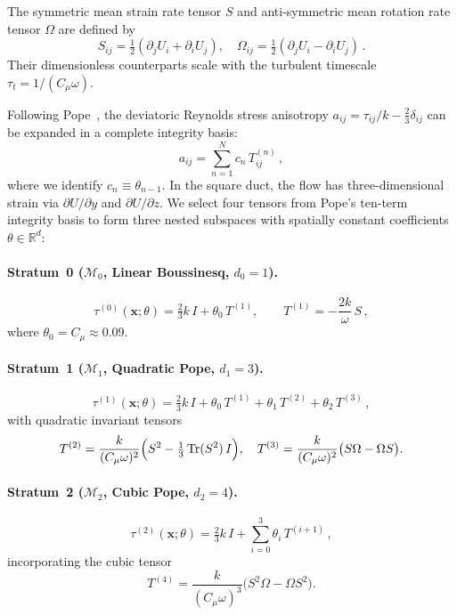 \documentclass[preprint,aps,prb,longbibliography,superscriptaddress]{revtex4-2}
\newcommand{\bx}{\mathbf{x}}
\newcommand{\Tr}{\operatorname{Tr}}
\begin{document}
The symmetric mean strain rate tensor $S$ and anti-symmetric mean rotation rate
tensor $\Omega$ are defined by
\begin{equation}
  S_{ij} = \tfrac{1}{2}(\partial_j U_i + \partial_i U_j), \quad
  \Omega_{ij} = \tfrac{1}{2}(\partial_j U_i - \partial_i U_j)\,.
\end{equation}
Their dimensionless counterparts scale with the turbulent timescale
$\tau_t = 1/(C_\mu \omega)$.

Following Pope~\cite{Pope1975}, the deviatoric Reynolds stress anisotropy
$a_{ij} = \tau_{ij}/k - \tfrac{2}{3}\delta_{ij}$ can be expanded in a
complete integrity basis:
\begin{equation}\label{eq:pope_expansion}
  a_{ij} = \sum_{n=1}^{N} c_n\, T_{ij}^{(n)}\,,
\end{equation}
where we identify $c_n \equiv \theta_{n-1}$. In the square duct, the flow has
three-dimensional strain via $\partial U/\partial y$ and $\partial U/\partial z$.
We select four tensors from Pope's ten-term integrity basis to form three
nested subspaces with spatially constant coefficients $\theta \in \mathbb{R}^d$:

\paragraph{Stratum~0 ($\mathcal{M}_0$, Linear Boussinesq, $d_0 = 1$).}
\begin{equation}\label{eq:stratum0}
  \tau^{(0)}(\bx;\theta) = \tfrac{2}{3}k\,I + \theta_0\, T^{(1)},
  \qquad
  T^{(1)} = -\frac{2k}{\omega}\, S\,,
\end{equation}
where $\theta_0 = C_\mu \approx 0.09$.

\paragraph{Stratum~1 ($\mathcal{M}_1$, Quadratic Pope, $d_1 = 3$).}
\begin{equation}\label{eq:stratum1}
  \tau^{(1)}(\bx;\theta) = \tfrac{2}{3}k\,I
  + \theta_0\, T^{(1)}
  + \theta_1\, T^{(2)}
  + \theta_2\, T^{(3)}\,,
\end{equation}
with quadratic invariant tensors
\begin{equation}\label{eq:T2T3}
  T^{(2)} = \frac{k}{(C_\mu\omega)^2}
    \Bigl(S^2 - \tfrac{1}{3}\Tr(S^2)\,I\Bigr),
  \quad
  T^{(3)} = \frac{k}{(C_\mu\omega)^2}
    \bigl(S\Omega - \Omega S\bigr).
\end{equation}

\paragraph{Stratum~2 ($\mathcal{M}_2$, Cubic Pope, $d_2 = 4$).}
\begin{equation}\label{eq:stratum2}
  \tau^{(2)}(\bx;\theta) = \tfrac{2}{3}k\,I
  + \sum_{i=0}^{3} \theta_i\, T^{(i+1)}\,,
\end{equation}
incorporating the cubic tensor
\begin{equation}\label{eq:T4}
  T^{(4)} = \frac{k}{(C_\mu\omega)^3}
    \bigl(S^2\Omega - \Omega S^2\bigr).
\end{equation}
\end{document}
